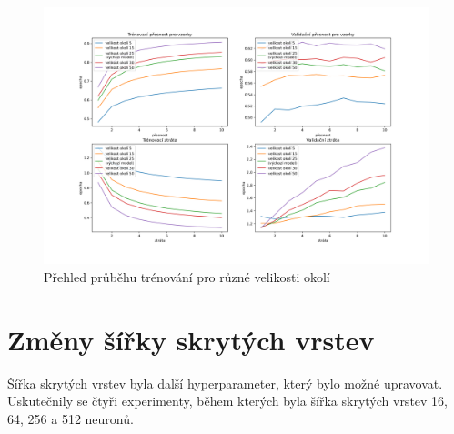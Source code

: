 \documentclass[FM,BP]{tulthesis}
\begin{document}
\begin{table}[htb]
\centering
\caption{Přehled nejlepších výsledků pro různé velikosti okolí}
\label{tab:best_results-margin}
\end{table}
\FloatBarrier

\begin{figure}[!htbp]
\centerline{\includegraphics[scale=.5]{training_course-margin.png}}
\caption{Přehled průběhu trénování pro různé velikosti okolí}
\label{fig:training_course-margin}
\end{figure}
\FloatBarrier

\section{Změny šířky skrytých vrstev} %
Šířka skrytých vrstev byla další hyperparameter, který bylo možné upravovat. Uskutečnily se čtyři experimenty, během kterých byla šířka skrytých vrstev 16, 64, 256 a 512 neuronů.
\end{document}
